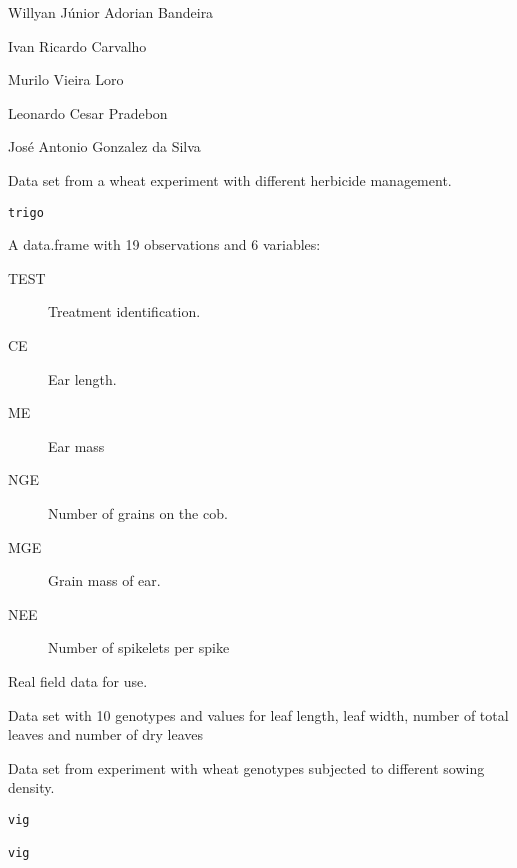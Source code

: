 \documentclass[a4paper]{book}
\begin{document}
%
\begin{Author}
Willyan Júnior Adorian Bandeira

Ivan Ricardo Carvalho

Murilo Vieira Loro

Leonardo Cesar Pradebon

José Antonio Gonzalez da Silva
\end{Author}
%
\begin{Description}
Data set from a wheat experiment with different herbicide management.
\end{Description}
%
\begin{Usage}
\begin{verbatim}
trigo
\end{verbatim}
\end{Usage}
%
\begin{Format}
A data.frame with 19 observations and 6 variables:
\begin{description}

\item[TEST] Treatment identification.
\item[CE] Ear length.
\item[ME] Ear mass
\item[NGE] Number of grains on the cob.
\item[MGE] Grain mass of ear.
\item[NEE] Number of spikelets per spike

\end{description}

\end{Format}
%
\begin{Source}
Real field data for use.
\end{Source}
%
\begin{Description}
Data set with 10 genotypes and values for leaf length, leaf width, number
of total leaves and number of dry leaves

Data set from experiment with wheat genotypes subjected to different
sowing density.
\end{Description}
%
\begin{Usage}
\begin{verbatim}
vig

vig
\end{verbatim}
\end{Usage}
%
\end{document}
